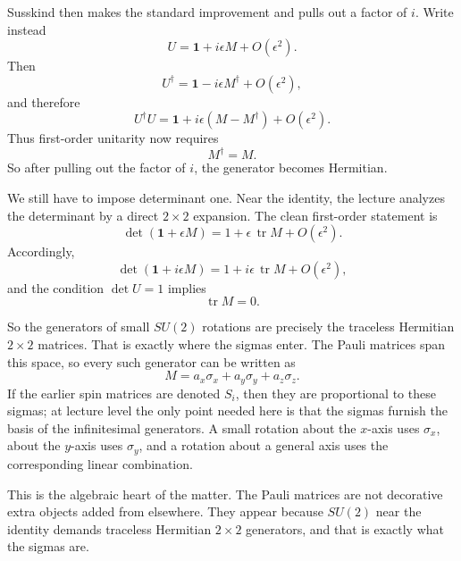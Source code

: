 Susskind then makes the standard improvement and pulls out a factor of \(i\). Write instead
\begin{equation}
U=\mathbf 1+i\epsilon M+O(\epsilon^2).
\end{equation}
Then
\[
U^\dagger = \mathbf 1-i\epsilon M^\dagger+O(\epsilon^2),
\]
and therefore
\begin{equation}
U^\dagger U
 = \mathbf 1+i\epsilon(M-M^\dagger)+O(\epsilon^2).
\end{equation}
Thus first-order unitarity now requires
\begin{equation}
M^\dagger=M.
\end{equation}
So after pulling out the factor of \(i\), the generator becomes Hermitian.

We still have to impose determinant one. Near the identity, the lecture analyzes the determinant by a direct \(2\times 2\) expansion. The clean first-order statement is
\begin{equation}
\det(\mathbf 1+\epsilon M)=1+\epsilon\,\operatorname{tr}M+O(\epsilon^2).
\end{equation}
Accordingly,
\begin{equation}
\det(\mathbf 1+i\epsilon M)=1+i\epsilon\,\operatorname{tr}M+O(\epsilon^2),
\end{equation}
and the condition \(\det U=1\) implies
\begin{equation}
\operatorname{tr}M=0.
\end{equation}

So the generators of small \(SU(2)\) rotations are precisely the traceless Hermitian \(2\times 2\) matrices. That is exactly where the sigmas enter. The Pauli matrices span this space, so every such generator can be written as
\begin{equation}
M=a_x\sigma_x+a_y\sigma_y+a_z\sigma_z.
\end{equation}
If the earlier spin matrices are denoted \(S_i\), then they are proportional to these sigmas; at lecture level the only point needed here is that the sigmas furnish the basis of the infinitesimal generators. A small rotation about the \(x\)-axis uses \(\sigma_x\), about the \(y\)-axis uses \(\sigma_y\), and a rotation about a general axis uses the corresponding linear combination.

This is the algebraic heart of the matter. The Pauli matrices are not decorative extra objects added from elsewhere. They appear because \(SU(2)\) near the identity demands traceless Hermitian \(2\times 2\) generators, and that is exactly what the sigmas are.

